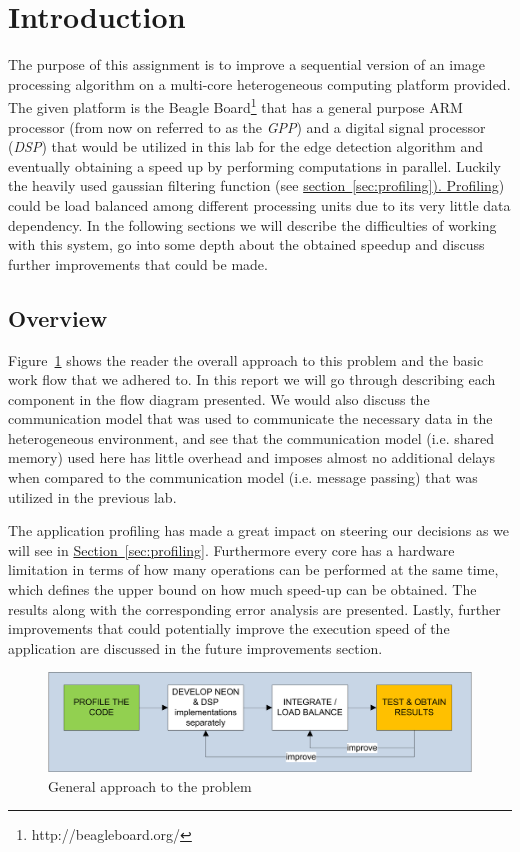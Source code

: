 \section{Introduction}

The purpose of this assignment is to improve a sequential version of an image processing algorithm on a multi-core heterogeneous computing platform provided. The given platform is the Beagle Board\footnote{http://beagleboard.org/} that has a general purpose ARM processor (from now on referred to as the \emph{GPP}) and a digital signal processor (\emph{DSP}) that would be utilized in this lab for the edge detection algorithm and eventually obtaining a speed up by performing computations in parallel. Luckily the heavily used gaussian filtering function (see \hyperref[sec:profiling]{section~\ref{sec:profiling}). Profiling}) could be load balanced among different processing units due to its very little data dependency. In the following sections we will describe the difficulties of working with this system, go into some depth about the obtained speedup and discuss further improvements that could be made.

\subsection{Overview}
Figure~\ref{fig:workflow} shows the reader the overall approach to this problem and the basic work flow that we adhered to. In this report we will go through describing each component in the flow diagram presented. We would also discuss the communication model that was used to communicate the necessary data in the heterogeneous environment, and see that the communication model (i.e. shared memory) used here has little overhead and imposes almost no additional delays when compared to the communication model (i.e. message passing) that was utilized in the previous lab.

The application profiling has made a great impact on steering our decisions as we will see in \hyperref[sec:profiling]{Section~\ref{sec:profiling}}. Furthermore every core has a hardware limitation in terms of how many operations can be performed at the same time, which defines the upper bound on how much speed-up can be obtained. The results along with the corresponding error analysis are presented. Lastly, further improvements that could potentially improve the execution speed of the application are discussed in the future improvements section.

\begin{figure}
\includegraphics[width=\linewidth]{drawings/workflow}
\caption{General approach to the problem}
\label{fig:workflow}
\end{figure}


